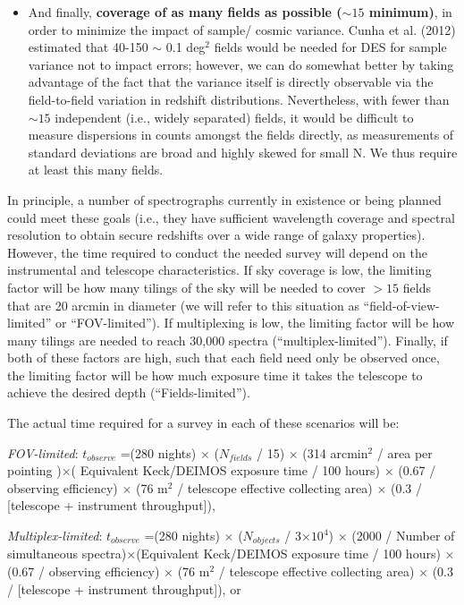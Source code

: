 \begin{itemize}
\item And finally, {\bf coverage of as many fields as possible ($\sim 15$ minimum)}, in order to minimize the impact of sample/ cosmic variance.  Cunha et al. (2012) estimated that 40-150 $\sim$ 0.1 deg$^2$ fields would be needed for DES for sample variance not to impact errors; however, we can do somewhat better by taking advantage of the fact that the variance itself is directly observable via the field-to-field variation in redshift distributions.  Nevertheless, with fewer than $\sim 15$ independent (i.e., widely separated) fields, it would be difficult to measure dispersions in counts amongst the fields directly, as measurements of standard deviations are broad and highly skewed for small N. We thus require at least this many fields.
\end{itemize}

In principle, a number of spectrographs currently in existence or being planned could meet these goals (i.e., they have sufficient wavelength coverage and spectral resolution to obtain secure redshifts over a wide range of galaxy properties).  However, the time required to conduct the needed survey will depend on the instrumental and telescope characteristics.  If sky coverage is low, the limiting factor will be how many tilings of the sky will be needed to cover $>15$ fields that are 20 arcmin in diameter (we will refer to this situation as ``field-of-view-limited'' or ``FOV-limited'').  If multiplexing is low, the limiting factor will be how many tilings are needed to reach 30,000 spectra (``multiplex-limited'').  Finally, if both of these factors are high, such that each field need only be observed once, the limiting factor will be how much exposure time it takes the telescope to achieve the desired depth (``Fields-limited'').  

The actual time required for a survey in each of these scenarios will be:

{\it FOV-limited}:  $t_{observe}$ =(280 nights) $\times$ ($N_{fields}$ / 15) $\times$ (314 arcmin$^2$ / area per pointing )$\times$( Equivalent Keck/DEIMOS exposure time / 100 hours) $\times$ (0.67 / observing efficiency) $\times$ (76 m$^2$  / telescope effective collecting area) $\times$ (0.3 / [telescope + instrument throughput]),

{\it Multiplex-limited}:  $t_{observe}$ =(280 nights) $\times$ ($N_{objects}$ / 3$\times10^4$) $\times$ (2000 / Number of simultaneous spectra)$\times$(Equivalent Keck/DEIMOS exposure time / 100 hours) $\times$ (0.67 / observing efficiency) $\times$ (76 m$^2$  / telescope effective collecting area) $\times$ (0.3 / [telescope + instrument throughput]), or

